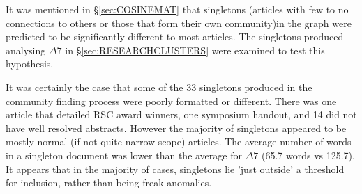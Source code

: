 It was mentioned in \S\ref{sec:COSINEMAT} that singletons (articles with few to no connections to others or those that form their own community)in the graph were predicted to be significantly different to most articles. The singletons produced analysing $\Delta7$ in \S\ref{sec:RESEARCHCLUSTERS} were examined to test this hypothesis.

It was certainly the case that some of the 33 singletons produced in the community finding process were poorly formatted or different. There was one article that detailed RSC award winners, one symposium handout, and 14 did not have well resolved abstracts. However the majority of singletons appeared to be mostly normal (if not quite narrow-scope) articles. The average number of words in a singleton document was lower than the average for $\Delta7$ (65.7 words vs 125.7). It appears that in the majority of cases, singletons lie 'just outside' a threshold for inclusion, rather than being freak anomalies.
